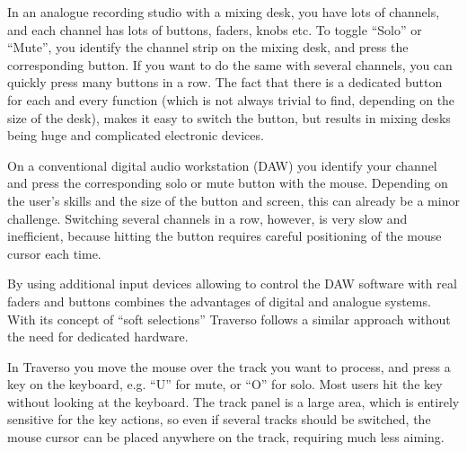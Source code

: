 In an analogue recording studio with a mixing desk, you have lots of channels, and each channel has lots of buttons, faders, knobs etc. To toggle ``Solo'' or ``Mute'', you identify the channel strip on the mixing desk, and press the corresponding button. If you want to do the same with several channels, you can quickly press many buttons in a row. The fact that there is a dedicated button for each and every function (which is not always trivial to find, depending on the size of the desk), makes it easy to switch the button, but results in mixing desks being huge and complicated electronic devices.

On a conventional digital audio workstation (DAW) you identify your channel and press the corresponding solo or mute button with the mouse. Depending on the user's skills and the size of the button and screen, this can already be a minor challenge. Switching several channels in a row, however, is very slow and inefficient, because hitting the button requires careful positioning of the mouse cursor each time.

By using additional input devices allowing to control the DAW software with real faders and buttons combines the advantages of digital and analogue systems. With its concept of ``soft selections'' Traverso follows a similar approach without the need for dedicated hardware.

In Traverso you move the mouse over the track you want to process, and press a key on the keyboard, e.g. ``U'' for mute, or ``O'' for solo. Most users hit the key without looking at the keyboard. The track panel is a large area, which is entirely sensitive for the key actions, so even if several tracks should be switched, the mouse cursor can be placed anywhere on the track, requiring much less aiming.

